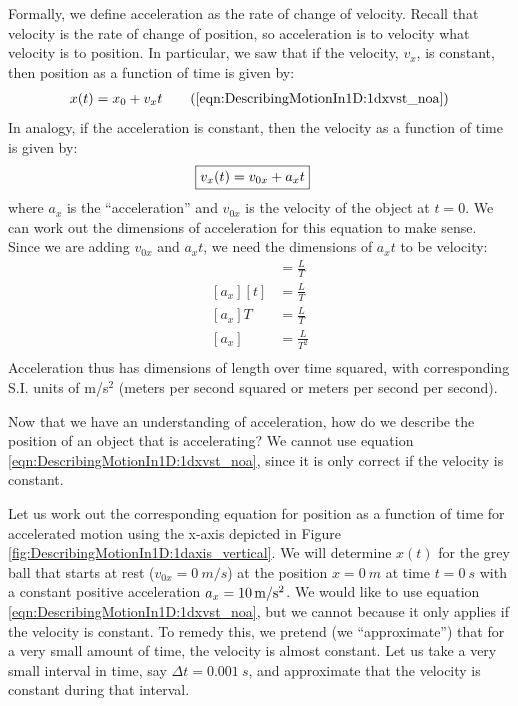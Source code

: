 Formally, we define acceleration as the rate of change of velocity. Recall that velocity is the rate of change of position, so acceleration is to velocity what velocity is to position. In particular, we saw that if the velocity, $v_x$, is constant, then position as a function of time is given by:
\begin{align}
x(t) = x_0 + v_xt \tag{\ref{eqn:DescribingMotionIn1D:1dxvst_noa}}
\end{align} 
In analogy, if the acceleration is constant, then the velocity as a function of time is given by:
\begin{align}
\label{eqn:DescribingMotionIn1DL1dvvst}
\Aboxed{v_x(t) = v_{0x} + a_xt }
\end{align}
where $a_x$ is the ``acceleration'' and $v_{0x}$ is the velocity of the object at $t=0$. We can work out the dimensions of acceleration for this equation to make sense. Since we are adding $v_{0x}$ and $a_xt$, we need the dimensions of $a_xt$ to be velocity:
\begin{align*}
[a_xt] &= \frac{L}{T} \\
[a_x][t] &= \frac{L}{T} \\
[a_x]T&= \frac{L}{T} \\
[a_x]&= \frac{L}{T^2} \\
\end{align*}
Acceleration thus has dimensions of length over time squared, with corresponding S.I. units of m/s$^2$ (meters per second squared or meters per second per second). 

Now that we have an understanding of acceleration, how do we describe the position of an object that is accelerating? We cannot use equation \ref{eqn:DescribingMotionIn1D:1dxvst_noa}, since it is only correct if the velocity is constant. 


Let us work out the corresponding equation for position as a function of time for accelerated motion using the x-axis depicted in Figure \ref{fig:DescribingMotionIn1D:1daxis_vertical}. We will determine $x(t)$ for the grey ball that starts at rest ($v_{0x}=\SI{0}{m/s}$) at the position $x=\SI{0}{m}$ at time $t=\SI{0}{s}$ with a constant positive acceleration $a_x=\SI{10}{m/s\squared}$. We would like to use equation \ref{eqn:DescribingMotionIn1D:1dxvst_noa}, but we cannot because it only applies if the velocity is constant. To remedy this, we pretend (we ``approximate'') that for a very small amount of time, the velocity is almost constant. Let us take a very small interval in time, say $\Delta t=\SI{0.001}{s}$, and approximate that the velocity is constant during that interval. 


